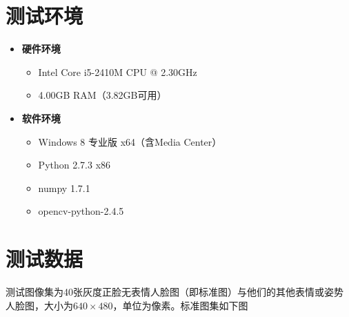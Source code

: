 \section{测试环境}
\label{sec:benchmark-env}

\begin{itemize}
  \item \textbf{硬件环境}
  \begin{itemize}
    \item Intel Core i5-2410M CPU @ 2.30GHz
    \item 4.00GB RAM（3.82GB可用）
  \end{itemize}
  \item \textbf{软件环境}
  \begin{itemize}
    \item Windows 8 专业版 x64（含Media Center） 
    \item Python 2.7.3 x86
    \item numpy 1.7.1
    \item opencv-python-2.4.5
  \end{itemize}
\end{itemize}

\section{测试数据}
\label{sec:benchmark-data}

测试图像集为40张灰度正脸无表情人脸图（即标准图）与他们的其他表情或姿势
人脸图\cite{dataset}，大小为$640 \times 480$，单位为像素。标准图集如下图

